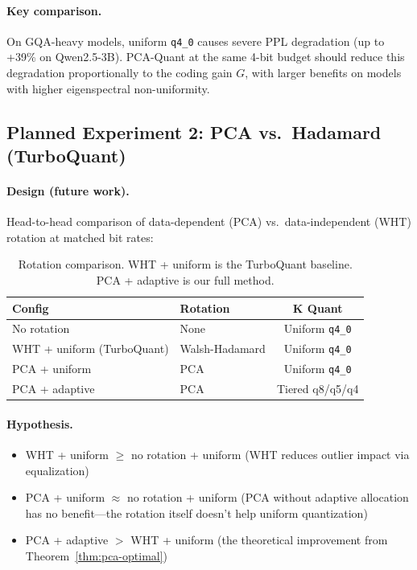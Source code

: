 \paragraph{Key comparison.}
On GQA-heavy models, uniform \texttt{q4\_0} causes severe PPL degradation (up to +39\% on Qwen2.5-3B). PCA-Quant at the same 4-bit budget should reduce this degradation proportionally to the coding gain $G$, with larger benefits on models with higher eigenspectral non-uniformity.

\subsection{Planned Experiment 2: PCA vs.\ Hadamard (TurboQuant)}

\paragraph{Design (future work).}
Head-to-head comparison of data-dependent (PCA) vs.\ data-independent (WHT) rotation at matched bit rates:

\begin{table}[h]
\centering
\begin{tabular}{llc}
\toprule
\textbf{Config} & \textbf{Rotation} & \textbf{K Quant} \\
\midrule
No rotation & None & Uniform \texttt{q4\_0} \\
WHT + uniform (TurboQuant) & Walsh-Hadamard & Uniform \texttt{q4\_0} \\
PCA + uniform & PCA & Uniform \texttt{q4\_0} \\
PCA + adaptive & PCA & Tiered q8/q5/q4 \\
\bottomrule
\end{tabular}
\caption{Rotation comparison. WHT + uniform is the TurboQuant baseline. PCA + adaptive is our full method.}
\label{tab:exp2-configs}
\end{table}

\paragraph{Hypothesis.}
\begin{itemize}
    \item WHT + uniform $\geq$ no rotation + uniform (WHT reduces outlier impact via equalization)
    \item PCA + uniform $\approx$ no rotation + uniform (PCA without adaptive allocation has no benefit---the rotation itself doesn't help uniform quantization)
    \item PCA + adaptive $>$ WHT + uniform (the theoretical improvement from Theorem~\ref{thm:pca-optimal})
\end{itemize}

